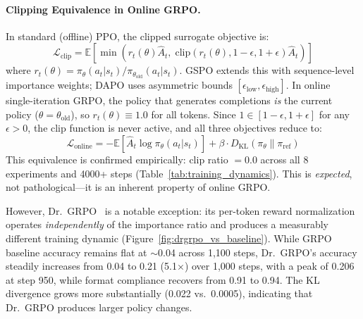 \documentclass{article}
\begin{document}
\paragraph{Clipping Equivalence in Online GRPO.}
In standard (offline) PPO, the clipped surrogate objective is:
\begin{equation}
\mathcal{L}_{\text{clip}} = \mathbb{E}\left[\min\left(r_t(\theta) \hat{A}_t,\; \text{clip}(r_t(\theta), 1{-}\epsilon, 1{+}\epsilon) \hat{A}_t\right)\right]
\end{equation}
where $r_t(\theta) = \pi_\theta(a_t|s_t) / \pi_{\theta_\text{old}}(a_t|s_t)$. GSPO extends this with sequence-level importance weights; DAPO uses asymmetric bounds $[\epsilon_\text{low}, \epsilon_\text{high}]$. In online single-iteration GRPO, the policy that generates completions \emph{is} the current policy ($\theta = \theta_\text{old}$), so $r_t(\theta) \equiv 1.0$ for all tokens. Since $1 \in [1{-}\epsilon, 1{+}\epsilon]$ for any $\epsilon > 0$, the clip function is never active, and all three objectives reduce to:
\begin{equation}
\mathcal{L}_{\text{online}} = -\mathbb{E}\left[\hat{A}_t \log \pi_\theta(a_t|s_t)\right] + \beta \cdot D_\text{KL}(\pi_\theta \| \pi_\text{ref})
\label{eq:online_equivalence}
\end{equation}
This equivalence is confirmed empirically: clip ratio $= 0.0$ across all 8 experiments and 4000+ steps (Table~\ref{tab:training_dynamics}). This is \emph{expected}, not pathological---it is an inherent property of online GRPO.

However, Dr.~GRPO~\citep{liu2025drgrpo} is a notable exception: its per-token reward normalization operates \emph{independently} of the importance ratio and produces a measurably different training dynamic (Figure~\ref{fig:drgrpo_vs_baseline}). While GRPO baseline accuracy remains flat at $\sim$0.04 across 1,100 steps, Dr.~GRPO's accuracy steadily increases from 0.04 to 0.21 (5.1$\times$) over 1,000 steps, with a peak of 0.206 at step 950, while format compliance recovers from 0.91 to 0.94. The KL divergence grows more substantially (0.022 vs.\ 0.0005), indicating that Dr.~GRPO produces larger policy changes.
\end{document}
